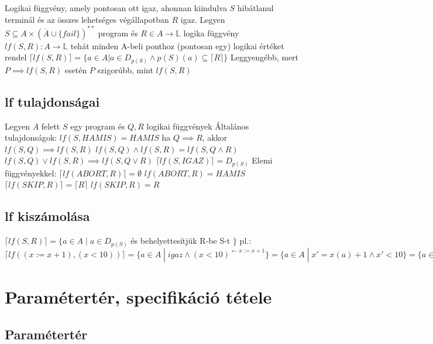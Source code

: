 \documentclass[12pt,a4paper]{article}
\begin{document}
\begin{outline}
	\1 Logikai függvény, amely pontosan ott igaz, ahonnan kiindulva $S$ hibátlanul terminál
	és az összes lehetséges végállapotban $R$ igaz.
	\1 Legyen $S \subseteq A \times (\overline{A} \cup \{fail\})^{**}$ program
	és $R \in A \to \mathbb{L}$ logika függvény
	\1 $lf(S,R) : A \to \mathbb{L}$
		\2 tehát minden A-beli ponthoz (pontosan egy) logikai értéket rendel
	\1 $\lceil lf(S,R) \rceil = \{ a \in A | a \in D_{p(S)}
	\wedge p(S)(a) \subseteq \lceil R \rceil \}$
	\1 Leggyengébb, mert $P \implies lf(S,R)$ esetén $P$ szigorúbb, mint $lf(S,R)$
\end{outline}

\subsection{lf tulajdonságai}

\begin{outline}
	\1 Legyen $A$ felett $S$ egy program és $Q,R$ logikai függvények
	\1 Általános tulajdonságok:
		\2 $lf(S,HAMIS) = HAMIS$
		\2 ha $Q \implies R$, akkor $lf(S,Q) \implies lf(S,R)$
		\2 $lf(S,Q) \wedge lf(S,R) = lf(S,Q \wedge R)$
		\2 $lf(S,Q) \lor lf(S,R) \implies lf(S,Q \lor R)$
		\2 $\lceil lf(S,IGAZ) \rceil = D_{p(S)}$
	\1 Elemi függvényekkel:
		\2 $\lceil lf(ABORT,R) \rceil = \emptyset$
		\2 $lf(ABORT,R) = HAMIS$
		\2 $\lceil lf(SKIP,R) \rceil = \lceil R \rceil$
		\2 $lf(SKIP,R) = R$
\end{outline}

\subsection{lf kiszámolása}

\begin{outline}
	\1 $\lceil lf(S,R) \rceil = \{a \in A \;|\; a \in D_{p(S)}$ és behelyettesítjük R-be S-t $\}$
	\1 pl.: $\lceil lf((x:=x+1),(x<10)) \rceil=\{a \in A \;|\; igaz \wedge (x<10)^{\leftarrow x:=x+1}\}=\{a \in A \;|\; x'=x(a)+1 \wedge x' < 10\}=\{a \in A \;|\; x(a)+1 < 10\} = (x<9)$
\end{outline}

\pagebreak

\section{Paramétertér, specifikáció tétele}

\subsection{Paramétertér}
\end{document}
